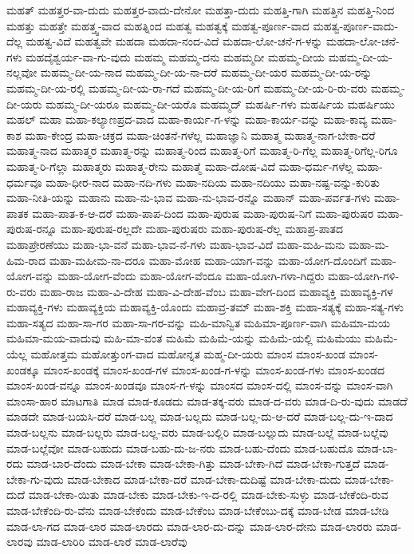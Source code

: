 {ಮಹತ್
ಮಹತ್ತರ-ವಾ-ದುದು
ಮಹತ್ತರ-ವಾದು-ದೇನೋ
ಮಹತ್ತಾ-ದುದು
ಮಹತ್ತಿ-ಗಾಗಿ
ಮಹತ್ತಿನ
ಮಹತ್ತಿ-ನಿಂದ
ಮಹತ್ತು
ಮಹತ್ತೇ
ಮಹತ್ತ್ವ-ವಾದ
ಮಹತ್ನಿಂದ
ಮಹತ್ವ
ಮಹತ್ವಕ್ಕೆ
ಮಹತ್ವ-ಪೂರ್ಣ-ವಾದ
ಮಹತ್ವ-ಪೂರ್ಣ-ವಾದು-ದೆಲ್ಲ
ಮಹತ್ವ-ವಿದೆ
ಮಹತ್ವವೇ
ಮಹದಾ
ಮಹದಾ-ನಂದ-ವಿದೆ
ಮಹದಾ-ಲೋ-ಚನೆ-ಗ-ಳನ್ನು
ಮಹದಾ-ಲೋ-ಚನೆ-ಗಳು
ಮಹದೈಶ್ವರ್ಯ-ವಾ-ಗು-ವುದು
ಮಹಮ್ಮ
ಮಹಮ್ಮ-ದನು
ಮಹಮ್ಮದೀ
ಮಹಮ್ಮ-ದೀಯ
ಮಹಮ್ಮ-ದೀ-ಯ-ನಲ್ಲವೋ
ಮಹಮ್ಮ-ದೀ-ಯ-ನಾದ
ಮಹಮ್ಮ-ದೀ-ಯ-ನಾ-ದರೆ
ಮಹಮ್ಮ-ದೀ-ಯರ
ಮಹಮ್ಮ-ದೀ-ಯ-ರನ್ನು
ಮಹಮ್ಮ-ದೀ-ಯ-ರಲ್ಲಿ
ಮಹಮ್ಮ-ದೀ-ಯ-ರಾ-ಗದೆ
ಮಹಮ್ಮ-ದೀ-ಯ-ರಿಗೆ
ಮಹಮ್ಮ-ದೀ-ಯ-ರಿ-ರು-ವರು
ಮಹಮ್ಮ-ದೀ-ಯರು
ಮಹಮ್ಮ-ದೀ-ಯರೂ
ಮಹಮ್ಮ-ದೀ-ಯರೊ
ಮಹಮ್ಮದ್
ಮಹರ್ಷಿ-ಗಳು
ಮಹರ್ಷಿಯ
ಮಹರ್ಷಿಯು
ಮಹಲ್
ಮಹಾ
ಮಹಾ-ಕಲ್ಯಾಣಪ್ರದ-ವಾದ
ಮಹಾ-ಕಾರ್ಯ-ಗ-ಳನ್ನು
ಮಹಾ-ಕಾರ್ಯ-ವನ್ನು
ಮಹಾ-ಕಾವ್ಯ
ಮಹಾ-ಕಾಶ
ಮಹಾ-ಕೇಂದ್ರ
ಮಹಾ-ಚಕ್ರದ
ಮಹಾ-ಚಿಂತನೆ-ಗಳೆಲ್ಲ
ಮಹಾಜ್ಞಾನಿ
ಮಹಾತ್ಮ
ಮಹಾತ್ಮ-ನಾಗ-ಬೇಕಾ-ದರೆ
ಮಹಾತ್ಮ-ನಾದ
ಮಹಾತ್ಮರ
ಮಹಾತ್ಮ-ರನ್ನು
ಮಹಾತ್ಮ-ರಿಂದ
ಮಹಾತ್ಮ-ರಿಗೆ
ಮಹಾತ್ಮ-ರಿ-ಗೆಲ್ಲ
ಮಹಾತ್ಮ-ರಿಗೆಲ್ಲ-ರಿಗೂ
ಮಹಾತ್ಮ-ರಿ-ಗೆಲ್ಲಾ
ಮಹಾತ್ಮರು
ಮಹಾತ್ಮ-ರೇನು
ಮಹಾತ್ಮೆ
ಮಹಾ-ದೋಷ-ವಿದೆ
ಮಹಾ-ಧರ್ಮ-ಗಳೆಲ್ಲ
ಮಹಾ-ಧರ್ಮವೂ
ಮಹಾ-ಧೀರ-ನಾದ
ಮಹಾ-ನದಿ-ಗಳು
ಮಹಾ-ನದಿಯ
ಮಹಾ-ನದಿಯು
ಮಹಾ-ನಷ್ಟ-ವನ್ನು-ಕುರಿತು
ಮಹಾ-ನೀತಿ-ಯನ್ನು
ಮಹಾನು
ಮಹಾ-ನು-ಭಾವ
ಮಹಾ-ನು-ಭಾವ-ರನ್ನೊ
ಮಹಾನ್
ಮಹಾ-ಪರ್ವತ-ಗಳು
ಮಹಾ-ಪಾತಕ
ಮಹಾ-ಪಾತ-ಕ-ಆ-ದರೆ
ಮಹಾ-ಪಾಪ-ದಿಂದ
ಮಹಾ-ಪುರುಷ
ಮಹಾ-ಪುರುಷ-ನಿಗೆ
ಮಹಾ-ಪುರುಷರ
ಮಹಾ-ಪುರುಷ-ರನ್ನೂ
ಮಹಾ-ಪುರುಷ-ರಲ್ಲದೇ
ಮಹಾ-ಪುರುಷರು
ಮಹಾ-ಪುರುಷ-ರೆಲ್ಲ
ಮಹಾಪ್ರ-ಪಾತದ
ಮಹಾಪ್ರೇರಣೆಯು
ಮಹಾ-ಭಾ-ವನೆ
ಮಹಾ-ಭಾವ-ನೆ-ಗಳು
ಮಹಾ-ಭಾವ-ವಿದೆ
ಮಹಾ-ಮಹಿ-ಮನು
ಮಹಾ-ಮ-ಹಿಮ-ರಾದ
ಮಹಾ-ಮಹೀಮ-ನಾ-ದರೂ
ಮಹಾ-ಮೋಹ
ಮಹಾ-ಯಾಗ-ವನ್ನು
ಮಹಾ-ಯೋಗ-ದೊಂದಿಗೆ
ಮಹಾ-ಯೋಗ-ವನ್ನು
ಮಹಾ-ಯೋಗ-ವೆಂದು
ಮಹಾ-ಯೋಗ-ವೆಂದೂ
ಮಹಾ-ಯೋಗಿ-ಗಳಾ-ಗಿದ್ದರು
ಮಹಾ-ಯೋಗಿ-ಗಳಿ-ರು-ವರು
ಮಹಾ-ರಾಜ
ಮಹಾ-ವಿ-ದೇಹ
ಮಹಾ-ವಿ-ದೇಹ-ವೆಂಬ
ಮಹಾ-ವೇಗ-ದಿಂದ
ಮಹಾವ್ಯಕ್ತಿ
ಮಹಾವ್ಯಕ್ತಿ-ಗಳ
ಮಹಾವ್ಯಕ್ತಿ-ಗಳು
ಮಹಾವ್ಯಕ್ತಿಯ
ಮಹಾವ್ಯಕ್ತಿ-ಯೊಂದು
ಮಹಾವ್ರ-ತಮ್
ಮಹಾ-ಶಕ್ತಿ
ಮಹಾ-ಸತ್ಯಕ್ಕೆ
ಮಹಾ-ಸತ್ಯ-ಗಳು
ಮಹಾ-ಸತ್ಯದ
ಮಹಾ-ಸಾ-ಗರ
ಮಹಾ-ಸಾ-ಗರ-ವನ್ನು
ಮಹಿ-ಮಾನ್ವಿತ
ಮಹಿಮಾ-ಪೂರ್ಣ-ವಾಗಿ
ಮಹಿಮಾ-ಮಯ
ಮಹಿಮಾ-ಮಯ-ವಾದುವು
ಮಹಿ-ಮಾ-ವಂತ
ಮಹಿಮೆ
ಮಹಿಮೆ-ಯನ್ನು
ಮಹಿಮೆ-ಯಲ್ಲಿ
ಮಹಿಮೆಯು
ಮಹಿಮೆ-ಯೆಲ್ಲ
ಮಹೋತ್ತಮ
ಮಹೋತ್ತುಂಗ-ವಾದ
ಮಹೋನ್ನತ
ಮಹ್ಮ-ದೀ-ಯರು
ಮಾಂಸ
ಮಾಂಸ-ಖಂಡ
ಮಾಂಸ-ಖಂಡಕ್ಕೂ
ಮಾಂಸ-ಖಂಡಕ್ಕೆ
ಮಾಂಸ-ಖಂಡ-ಗಳ
ಮಾಂಸ-ಖಂಡ-ಗ-ಳನ್ನು
ಮಾಂಸ-ಖಂಡ-ಗಳು
ಮಾಂಸ-ಖಂಡದ
ಮಾಂಸ-ಖಂಡ-ವನ್ನೂ
ಮಾಂಸ-ಖಂಡವೂ
ಮಾಂಸ-ಗ-ಳನ್ನು
ಮಾಂಸದ
ಮಾಂಸ-ದಲ್ಲಿ
ಮಾಂಸ-ವನ್ನು
ಮಾಂಸ-ವಾಗಿ
ಮಾಂಸಾ-ಹಾರ
ಮಾಟಗಾತಿ
ಮಾಡ
ಮಾಡ-ಕೂಡದು
ಮಾಡ-ತಕ್ಕ-ವರು
ಮಾಡ-ದ-ವರು
ಮಾಡ-ದಿ-ರು-ವುದು
ಮಾಡದೆ
ಮಾಡದೇ
ಮಾಡ-ಬಯಸಿ-ದರೆ
ಮಾಡ-ಬಲ್ಲ
ಮಾಡ-ಬಲ್ಲದು
ಮಾಡ-ಬಲ್ಲ-ದು-ಆ-ದರೆ
ಮಾಡ-ಬಲ್ಲ-ದು-ಇ-ದಾದ
ಮಾಡ-ಬಲ್ಲನು
ಮಾಡ-ಬಲ್ಲರು
ಮಾಡ-ಬಲ್ಲ-ವರು
ಮಾಡ-ಬಲ್ಲಿರಿ
ಮಾಡ-ಬಲ್ಲುದು
ಮಾಡ-ಬಲ್ಲೆ
ಮಾಡ-ಬಲ್ಲೆವು
ಮಾಡ-ಬಲ್ಲೆವೋ
ಮಾಡ-ಬಹುದು
ಮಾಡ-ಬಹು-ದು-ಜ-ನರು
ಮಾಡ-ಬಹು-ದೆಂದು
ಮಾಡ-ಬಹುದೊ
ಮಾಡ-ಬಾ-ರದು
ಮಾಡ-ಬಾರ-ದೆಂದು
ಮಾಡ-ಬೇಕಾ
ಮಾಡ-ಬೇಕಾ-ಗಿತ್ತು
ಮಾಡ-ಬೇಕಾ-ಗಿದೆ
ಮಾಡ-ಬೇಕಾ-ಗುತ್ತದೆ
ಮಾಡ-ಬೇಕಾ-ಗು-ವುದು
ಮಾಡ-ಬೇಕಾದ
ಮಾಡ-ಬೇಕಾ-ದರೆ
ಮಾಡ-ಬೇಕಾ-ದುದಿಷ್ಟೆ
ಮಾಡ-ಬೇಕಾ-ದುದು
ಮಾಡ-ಬೇಕಾ-ದುದೆ
ಮಾಡ-ಬೇಕಾ-ಯಿತು
ಮಾಡ-ಬೇಕು
ಮಾಡ-ಬೇಕು-ಇ-ದ-ರಲ್ಲಿ
ಮಾಡ-ಬೇಕು-ಸುಳ್ಳು
ಮಾಡ-ಬೇಕೆಂದಿ-ರುವ
ಮಾಡ-ಬೇಕೆಂದಿ-ರು-ವೆನು
ಮಾಡ-ಬೇಕೆಂದು
ಮಾಡ-ಬೇಕೆಂಬ
ಮಾಡ-ಬೇಕೆಂಬು-ದಕ್ಕೆ
ಮಾಡ-ಬೇಡ
ಮಾಡ-ಬೇಡಿ
ಮಾಡ-ಲಾ-ಗದ
ಮಾಡ-ಲಾರ
ಮಾಡ-ಲಾರದು
ಮಾಡ-ಲಾರ-ದು-ದನ್ನು
ಮಾಡ-ಲಾರ-ದೇನು
ಮಾಡ-ಲಾರರು
ಮಾಡ-ಲಾರವು
ಮಾಡ-ಲಾರಿರಿ
ಮಾಡ-ಲಾರೆ
ಮಾಡ-ಲಾರೆವು
}
